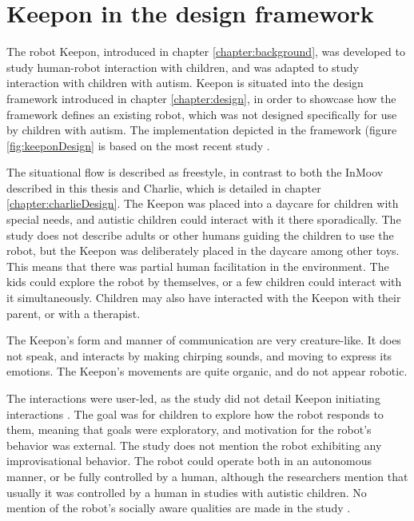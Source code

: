 
\chapter{Keepon in the design framework}
\label{chapter:keeponDesign}

The robot Keepon, introduced in chapter \ref{chapter:background}, was developed to study human-robot interaction with children, and was adapted to study interaction with children with autism. Keepon is situated into the design framework introduced in chapter \ref{chapter:design}, in order to showcase how the framework defines an existing robot, which was not designed specifically for use by children with autism. The implementation depicted in the framework (figure \ref{fig:keeponDesign} is based on the most recent study \cite{kozima2009keepon}.

The situational flow is described as freestyle, in contrast to both the InMoov described in this thesis and Charlie, which is detailed in chapter \ref{chapter:charlieDesign}. The Keepon was placed into a daycare for children with special needs, and autistic children could interact with it there sporadically. The study does not describe adults or other humans guiding the children to use the robot, but the Keepon was deliberately placed in the daycare among other toys. This means that there was partial human facilitation in the environment. The kids could explore the robot by themselves, or a few children could interact with it simultaneously. Children may also have interacted with the Keepon with their parent, or with a therapist.

The Keepon's form and manner of communication are very creature-like. It does not speak, and interacts by making chirping sounds, and moving to express its emotions. The Keepon's movements are quite organic, and do not appear robotic. 

The interactions were user-led, as the study did not detail Keepon initiating interactions \cite{kozima2009keepon}. The goal was for children to explore how the robot responds to them, meaning that goals were exploratory, and motivation for the robot's behavior was external. The study does not mention the robot exhibiting any improvisational behavior. The robot could operate both in an autonomous manner, or be fully controlled by a human, although the researchers mention that usually it was controlled by a human in studies with autistic children. No mention of the robot's socially aware qualities are made in the study \cite{kozima2009keepon}.






